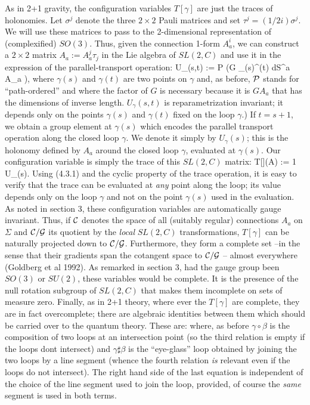 As in 2+1 gravity, the configuration variables $T[\gamma ]$ are just the
traces of holono\-mi\-es. Let $\sigma^j$ denote the three $2\times 2$ Pauli
matrices and set $\tau^j = (1/2i)\sigma^j$. We will use these matrices to
pass to the 2-dimensional representation of (complexified) $SO(3)$. Thus,
given the connection 1-form $A_a^i$, we can construct a $2\times 2$ matrix
$A_a := A_a^j\tau_j$ in the Lie algebra of $SL(2,C)$ and use it in the
expression of the parallel-transport operation:
\bneq
U_\gamma(s,t) := {\cal P}\- \exp \big(G\-\- \lint_{\gamma(s)}^{\gamma(t)}\-\-
dS^a A_a \-\big),
where $\gamma(s)$ and $\gamma(t)$ are two points on $\gamma$ and, as before,
${\cal P}$ stands for ``path-ordered'' and where the factor of $G$ is
necessary because it is $GA_a$ that has the dimensions of inverse length.
$U_\gamma (s,t)$ is
reparametrization invariant; it depends only on the points $\gamma(s)$
and $\gamma(t)$ fixed on the loop $\gamma$.) If $t = s+1$, we
obtain a group element at $\gamma(s)$ which encodes the parallel transport
operation along the closed loop $\gamma$. We denote it simply by
$U_\gamma(s)$; this is the holonomy defined by $A_a$ around the closed loop
$\gamma$, evaluated at $\gamma(s)$. Our configuration variable is
simply the trace of this $SL(2,C)$ matrix:
\bneq
T[\gamma ](A) := {1}\-\tr\- U_\gamma (s).
Using  (4.3.1) and the cyclic property of the trace operation, it is easy
to verify that the trace can be evaluated at {\it any} point along the loop;
its value depends only on the loop $\gamma$ and not on the point $\gamma(s)$
used in the evaluation. As noted in section 3, these configuration variables
are automatically gauge invariant. Thus, if ${\cal C}$ denotes the space
of all (suitably regular) connections $A_a$ on $\Sigma$ and ${\cal C}/
{\cal G}$ its quotient by the {\it local} $SL(2,C)$ transformations,
$T[\gamma]$ can be naturally projected down to ${\cal C}/{\cal G}$.
Furthermore, they form a complete set  --in the sense that their gradients
span the cotangent space to ${\cal C}/{\cal G}$ -- almost  everywhere
(Goldberg et al 1992). As remarked in section 3, had the gauge group been
$SO(3)$ or $SU(2)$, these variables would be complete. It is the presence
of the null rotation subgroup of $SL(2,C)$ that makes them incomplete on
sets of measure zero. Finally, as in 2+1 theory, where ever the $T[\gamma
]$ are complete, they are in fact overcomplete; there are algebraic
identities between them which should be carried over to the quantum theory.
These are:
where, as before $\gamma \circ \beta$ is the composition of two loops at an
intersection point (so the third relation is empty if the loops dont
intersect) and $\gamma\sharp\beta $ is the ``eye-glass'' loop obtained by
joining the two loops by a line segment (whence the fourth relation {\it is}
relevant even if the loops do not intersect). The right hand side of the
last equation is independent of the choice of the line segment used to
join the loop, provided, of course the {\it same} segment is used in both
terms.

